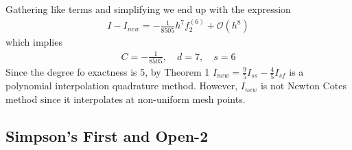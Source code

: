 \documentclass[12pt]{article}
\theoremstyle{remark}
\begin{document}
Gathering like terms and simplifying we end up with the expression
\begin{align}
	I - I_{new} = -\frac{1}{8505}h^7f^{(6)}_2 + \mathcal{O}(h^8)
\end{align}
which implies
\begin{align*}
C = -\frac{1}{8505}, \quad d = 7, \quad s = 6
\end{align*}
Since the degree fo exactness is 5, by Theorem 1 $I_{new} = \frac{9}{5}I_{ss} - \frac{4}{5}I_{sf}$ is a polynomial interpolation quadrature method. However, $I_{new}$ is not Newton Cotes method since it interpolates at non-uniform mesh points. 

\newpage

\subsection{Simpson's First and Open-2}
\end{document}
